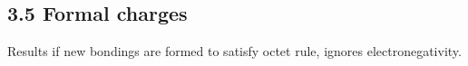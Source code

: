 \subsection{3.5 Formal charges}
    Results if new bondings are formed to satisfy octet rule, ignores electronegativity.
